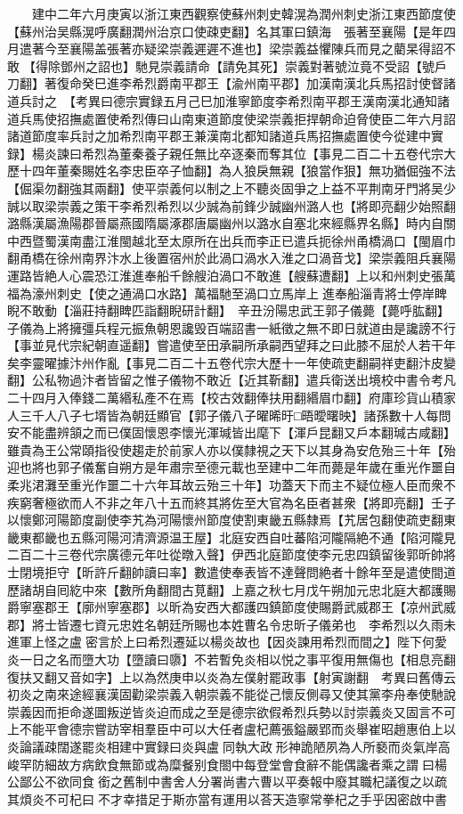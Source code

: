 　　建中二年六月庚寅以浙江東西觀察使蘇州刺史韓滉為潤州刺史浙江東西節度使【蘇州治吴縣滉呼廣翻潤州治京口使疎吏翻】名其軍曰鎮海　張著至襄陽【是年四月遣著今至襄陽盖張著亦疑梁崇義遲遲不進也】梁崇義益懼陳兵而見之藺杲得詔不敢【得除鄧州之詔也】馳見崇義請命【請免其死】崇義對著號泣竟不受詔【號戶刀翻】著復命癸巳進李希烈爵南平郡王【渝州南平郡】加漢南漢北兵馬招討使督諸道兵討之　【考異曰德宗實録五月己巳加淮寧節度李希烈南平郡王漢南漢北通知諸道兵馬使招撫處置使希烈傳曰山南東道節度使梁崇義拒捍朝命迫脅使臣二年六月詔諸道節度率兵討之加希烈南平郡王兼漢南北都知諸道兵馬招撫處置使今從建中實録】楊炎諫曰希烈為董秦養子親任無比卒逐秦而奪其位【事見二百二十五卷代宗大歷十四年董秦賜姓名李忠臣卒子恤翻】為人狼戾無親【狼當作狠】無功猶倔強不法【倔渠勿翻強其兩翻】使平崇義何以制之上不聽炎固爭之上益不平荆南牙門將吴少誠以取梁崇義之策干李希烈希烈以少誠為前鋒少誠幽州潞人也【將即亮翻少始照翻潞縣漢屬漁陽郡晉屬燕國隋屬涿郡唐屬幽州以潞水自塞北來經縣界名縣】時内自關中西暨蜀漢南盡江淮閩越北至太原所在出兵而李正已遣兵扼徐州甬橋渦口【閩眉巾翻甬橋在徐州南界汴水上後置宿州於此渦口渦水入淮之口渦音戈】梁崇義阻兵襄陽運路皆絶人心震恐江淮進奉船千餘艘泊渦口不敢進【艘蘇遭翻】上以和州刺史張萬福為濠州刺史【使之通渦口水路】萬福馳至渦口立馬岸上進奉船淄青將士停岸睥睨不敢動【淄莊持翻睥匹詣翻睨研計翻】　辛丑汾陽忠武王郭子儀薨【薨呼肱翻】子儀為上將擁彊兵程元振魚朝恩讒毁百端詔書一紙徵之無不即日就道由是讒謗不行【事並見代宗紀朝直遥翻】嘗遣使至田承嗣所承嗣西望拜之曰此膝不屈於人若干年矣李靈曜據汴州作亂【事見二百二十五卷代宗大歷十一年使疏吏翻嗣祥吏翻汴皮變翻】公私物過汴者皆留之惟子儀物不敢近【近其靳翻】遣兵衛送出境校中書令考凡二十四月入俸錢二萬緡私產不在焉【校古效翻俸扶用翻緡眉巾翻】府庫珍貨山積家人三千人八子七壻皆為朝廷顯官【郭子儀八子曜晞旴□晤曖曙映】諸孫數十人每問安不能盡辨頷之而已僕固懷恩李懷光渾瑊皆出麾下【渾戶昆翻又戶本翻瑊古咸翻】雖貴為王公常頤指役使趨走於前家人亦以僕隸視之天下以其身為安危殆三十年【殆迎也將也郭子儀奮自朔方是年肅宗至德元載也至建中二年而薨是年歲在重光作噩自柔兆涒灘至重光作噩二十六年耳故云殆三十年】功蓋天下而主不疑位極人臣而衆不疾窮奢極欲而人不非之年八十五而終其將佐至大官為名臣者甚衆【將即亮翻】壬子以懷鄭河陽節度副使李艽為河陽懷州節度使割東畿五縣隸焉【艽居包翻使疏吏翻東畿東都畿也五縣河陽河清濟源温王屋】北庭安西自吐蕃陷河隴隔絶不通【陷河隴見二百二十三卷代宗廣德元年吐從暾入聲】伊西北庭節度使李元忠四鎮留後郭昕帥將士閉境拒守【昕許斤翻帥讀曰率】數遣使奉表皆不達聲問絶者十餘年至是遣使間道歷諸胡自囘紇中來【數所角翻間古莧翻】上嘉之秋七月戊午朔加元忠北庭大都護賜爵寧塞郡王【廓州寧塞郡】以昕為安西大都護四鎮節度使賜爵武威郡王【凉州武威郡】將士皆遷七資元忠姓名朝廷所賜也本姓曹名令忠昕子儀弟也　李希烈以久雨未進軍上怪之盧密言於上曰希烈遷延以楊炎故也【因炎諫用希烈而間之】陛下何愛炎一日之名而墮大功【墮讀曰隳】不若暫免炎相以悦之事平復用無傷也【相息亮翻復扶又翻又音如字】上以為然庚申以炎為左僕射罷政事【射寅謝翻　考異曰舊傳云初炎之南來途經襄漢固勸梁崇義入朝崇義不能從己懷反側尋又使其黨李舟奉使馳說崇義因而拒命遂圖叛逆皆炎迫而成之至是德宗欲假希烈兵勢以討崇義炎又固言不可上不能平會德宗嘗訪宰相羣臣中可以大任者盧杞薦張鎰嚴郢而炎舉崔昭趙惠伯上以炎論議疎闊遂罷炎相建中實録曰炎與盧同執大政形神詭陋夙為人所褻而炎氣岸高峻罕防細故方病飲食無節或為糜餐别食閤中每登堂會食辭不能偶讒者乘之謂曰楊公鄙公不欲同食銜之舊制中書舍人分署尚書六曹以平奏報中廢其職杞議復之以疏其煩炎不可杞曰不才幸措足于斯亦當有運用以荅天造寧常拳杞之手乎因密啟中書